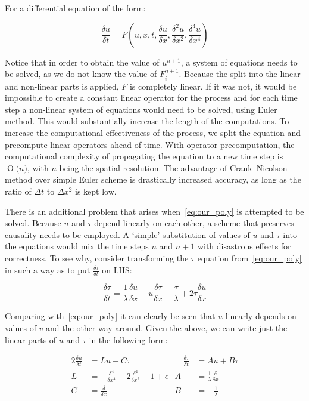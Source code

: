 \documentclass[11pt,a4paper]{article}
\newcommand{\BigO}[1]{\ensuremath{\operatorname{O}\bigl(#1\bigr)}}
\begin{document}
For a differential equation of the form:

\begin{equation}\label{eq:cn_eq}
    \frac{\delta u}{\delta t} = F(u, x, t, \frac{\delta u}{\delta x}, \frac{\delta^2u}{\delta x^2}, \frac{\delta^4u}{\delta x^4})
\end{equation}

Notice that in order to obtain the value of $u^{n+1}$, a system of equations needs to be solved, as we do not know the value of $F^{n+1}_i$.
Because the split into the linear and non-linear parts is applied, $F$ is completely linear.
If it was not, it would be impossible to create a constant linear operator for the process and for each time step a non-linear system of equations would need to be solved, using Euler method.
This would substantially increase the length of the computations.
To increase the computational effectiveness of the process, we split the equation and precompute linear operators ahead of time.
With operator precomputation, the computational complexity of propagating the equation to a new time step is \BigO{n}, with $n$ being the spatial resolution.
The advantage of Crank--Nicolson method over simple Euler scheme is drastically increased accuracy, as long as the ratio of $\Delta t$ to $\Delta x^2$ is kept low.

There is an additional problem that arises when~\eqref{eq:our_poly} is attempted to be solved.
Because $u$ and $\tau$ depend linearly on each other, a scheme that preserves causality needs to be employed.
A `simple' substitution of values of $u$ and $\tau$ into the equations would mix the time steps $n$ and $n+1$ with disastrous effects for correctness.
To see why, consider transforming the $\tau$ equation from~\eqref{eq:our_poly} in such a way as to put $\frac{\delta \tau}{\delta t}$ on LHS:

\begin{equation}\label{eq:tau_transf}
    \frac{\delta \tau}{\delta t} = \frac{1}{\lambda}\frac{\delta u}{\delta x} - u\frac{\delta \tau}{\delta x} - \frac{\tau}{\lambda} + 2\tau\frac{\delta u}{\delta x}
\end{equation}

Comparing with~\eqref{eq:our_poly} it can clearly be seen that $u$ linearly depends on values of $v$ and the other way around.
Given the above, we can write just the linear parts of $u$ and $\tau$ in the following form:

\begin{alignat}{2}
    \frac{\delta u}{\delta t} &= Lu + C\tau &\quad \frac{\delta \tau}{\delta t} &= Au + B\tau\\
    L &= -\frac{\delta^4}{\delta x^4} - 2\frac{\delta^2}{\delta x^2} - 1 + \epsilon & A &= \frac{1}{\lambda}\frac{\delta}{\delta x} \nonumber \\
    C &= \frac{\delta}{\delta x} & B &= - \frac{1}{\lambda} \nonumber
\end{alignat}
\end{document}
